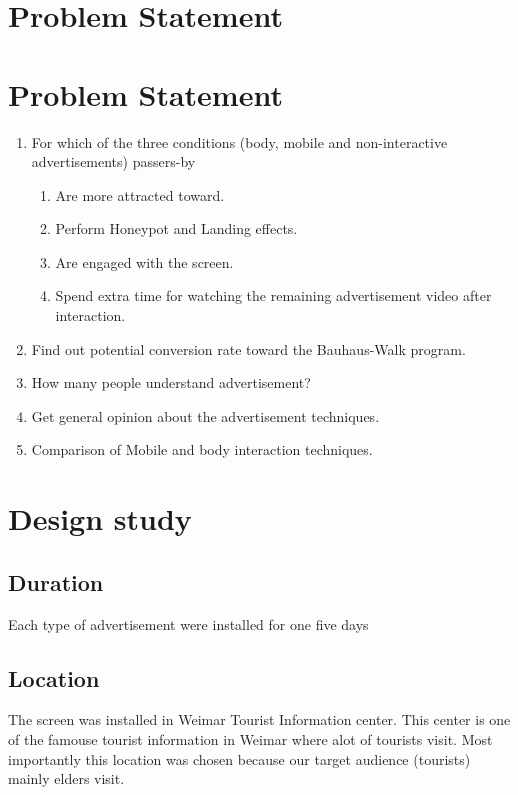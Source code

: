 \section{Problem Statement}



\section{Problem Statement}
\begin{enumerate}

\item	For which of the three conditions (body, mobile and non-interactive advertisements) passers-by 

\begin{enumerate}
\item	Are more attracted toward.
\item	Perform Honeypot and Landing effects.
\item	Are engaged with the screen.
\item	Spend extra time for watching the remaining advertisement video after interaction.
\end{enumerate}

\item   Find out potential conversion rate toward the Bauhaus-Walk program.
\item	How many people understand advertisement?
\item	Get general opinion about the advertisement techniques.
\item	Comparison of Mobile and body interaction techniques.

\end{enumerate}









\section{Design study}


\subsection{Duration}
Each type of advertisement were installed for one five days 


\subsection{Location}
The screen was installed in Weimar Tourist Information center. This center is one of the famouse tourist information in Weimar where alot of tourists visit. Most importantly this location was chosen because our target audience (tourists) mainly elders visit.


